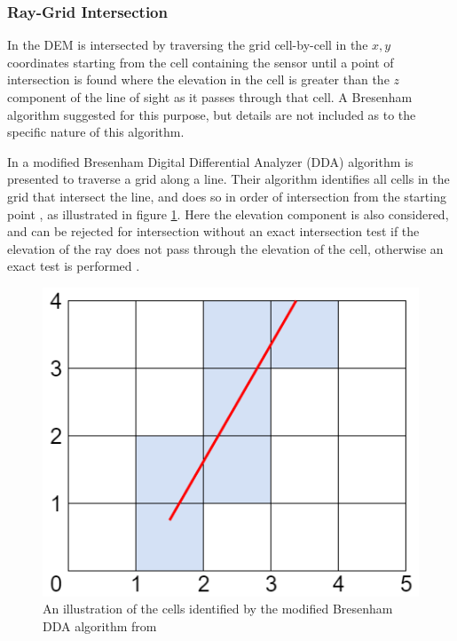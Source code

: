 \documentclass[journal]{IEEEtran}
\begin{document}
\subsubsection{Ray-Grid Intersection} \label{raygridintersection}
In \cite{collins1998using} the DEM is intersected by traversing the grid cell-by-cell in the $x,y$ coordinates starting from the cell containing the sensor until a point of intersection is found where the elevation in the cell is greater than the $z$ component of the line of sight as it passes through that cell. A Bresenham algorithm suggested for this purpose, but details are not included as to the specific nature of this algorithm.

In \cite{musgrave1988grid} a modified Bresenham Digital Differential Analyzer (DDA) algorithm is presented to traverse a grid along a line. Their algorithm identifies all cells in the grid that intersect the line, and does so in order of intersection from the starting point \cite{musgrave1988grid}, as illustrated in figure \ref{fig:linegrid}. Here the elevation component is also considered, and can be rejected for intersection without an exact intersection test if the elevation of the ray does not pass through the elevation of the cell, otherwise an exact test is performed \cite{musgrave1988grid}.

\begin{figure}[ht]
    \centering
    \includegraphics[scale=0.3]{LineGrid.png}
    \caption{An illustration of the cells identified by the modified Bresenham DDA algorithm from \cite{musgrave1988grid}}
    \label{fig:linegrid}
\end{figure}
\end{document}
